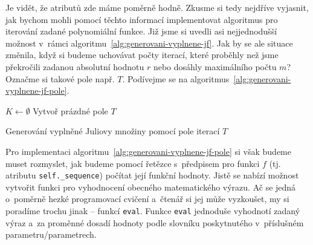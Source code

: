 Je vidět, že atributů zde máme poměrně hodně. Zkusme si tedy nejdříve vyjasnit, jak bychom mohli pomocí těchto informací implementovat algoritmus pro iterování zadané polynomiální funkce. Již jsme si uvedli asi nejjednodušší možnost v~rámci algoritmu~\ref{alg:generovani-vyplnene-jf}. Jak by se ale situace změnila, když si budeme uchovávat počty iterací, které proběhly než jsme překročili zadanou absolutní hodnotu $r$ nebo dosáhly maximálního počtu $m$? Označme si takové pole např. $T$. Podívejme se na algoritmus~\ref{alg:generovani-vyplnene-jf-pole}.
\begin{algorithm}[h]
    $K\gets\emptyset$\;
    Vytvoř prázdné pole $T$\;
    \;
    \caption{Generování vyplněné Juliovy množiny pomocí pole iterací $T$}
    \label{alg:generovani-vyplnene-jf-pole}
\end{algorithm}
Pro implementaci algoritmu~\ref{alg:generovani-vyplnene-jf-pole} si však budeme muset rozmyslet, jak budeme pomocí řetězce s~předpisem pro funkci $f$ (tj. atributu \texttt{self.\_sequence}) počítat její funkční hodnoty. Jistě se nabízí možnost vytvořit funkci pro vyhodnocení obecného matematického výrazu. Ač se jedná o~poměrně hezké programovací cvičení a~čtenář si jej může vyzkoušet, my si poradíme trochu jinak -- funkcí \texttt{eval}. Funkce \texttt{eval} jednoduše vyhodnotí zadaný výraz a~za proměnné dosadí hodnoty podle slovníku poskytnutého v~příslušném parametru/parametrech.

